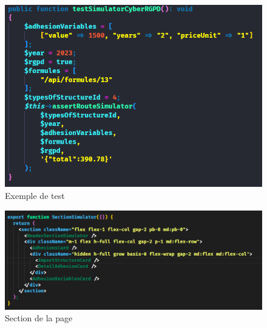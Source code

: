 \documentclass[a4paper,12pt]{report}
\begin{document}
\begin{figure}[H]
    \centering
    \includegraphics[scale=0.6]{exempleTest.png}
    \caption{Exemple de test}
    \label{fig:test}
\end{figure}
\begin{figure}[H]
    \centering
    \includegraphics[scale=0.45]{sectionImage.png}
    \caption{Section de la page}
    \label{fig:section}
\end{figure}
\end{document}
